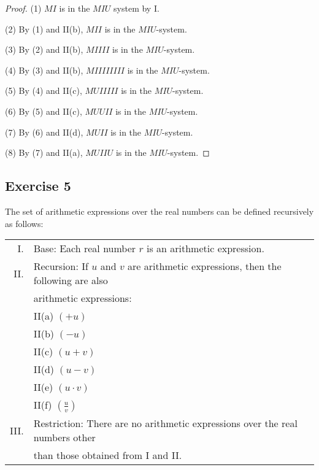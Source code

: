 \documentclass[14pt]{extarticle}
\newcommand{\dps}{\displaystyle}
\begin{document}
\begin{proof}
    (1) $M I$ is in the $M I U$ system by I.

    (2) By (1) and II(b), $M I I$ is in the $M I U$-system.

    (3) By (2) and II(b), $M I I I I$ is in the $M I U$-system.

    (4) By (3) and II(b), $M I I I I I I I I$ is in the $M I U$-system.

    (5) By (4) and II(c), $M U I I I I I$ is in the $M I U$-system.

    (6) By (5) and II(c), $M U U I I$ is in the $M I U$-system.

    (7) By (6) and II(d), $M U I I$ is in the $M I U$-system.

    (8) By (7) and II(a), $M U I I U$ is in the $M I U$-system.

\end{proof}

\subsection{Exercise 5}
The set of arithmetic expressions over the real numbers can be defined recursively as follows:

\begin{tabular}{rl}
    I.   & Base: Each real number $r$ is an arithmetic expression.                           \\
    II.  & Recursion: If $u$ and $v$ are arithmetic expressions, then the following are also \\
         & arithmetic expressions:                                                           \\
         & II(a) $(+u)$                                                                      \\
         & II(b) $(-u)$                                                                      \\
         & II(c) $(u + v)$                                                                   \\
         & II(d) $(u - v)$                                                                   \\
         & II(e) $(u \cdot v)$                                                               \\
         & II(f) \(\dps \left(\frac{u}{v}\right)\)                                           \\
    III. & Restriction: There are no arithmetic expressions over the real numbers other      \\
         & than those obtained from I and II.
\end{tabular}
\end{document}
